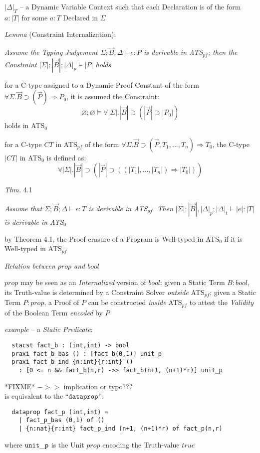 $|\Delta|_T$ -- a Dynamic Variable Context such that each Declaration
is of the form $a:|T|$ for some $a:T$ Declared in $\Sigma$

\emph{Lemma} (Constraint Internalization):

\emph{Assume the Typing Judgement $\Sigma;\vec{B};\Delta |- e:P$ is
  derivable in ATS$_{pf}$; then the Constraint
  $|\Sigma|;|\vec{B}|;|\Delta|_p \vDash |P|$ holds}

for a C-type assigned to a Dynamic Proof Constant of the form $\forall
\Sigma.\vec{B} \supset (\vec{P}) \Rightarrow P_0$, it is assumed the
Constraint:
\[
  \varnothing;\varnothing \vDash
     \forall|\Sigma|.|\vec{B}| \supset (|\vec{P}| \supset |P_0|)
\]
holds in ATS$_0$

for a C-type $CT$ in ATS$_{pf}$ of the form $\forall \Sigma.\vec{B}
\supset (\vec{P},T_1,...,T_n) \Rightarrow T_0$, the C-type $|CT|$ in
ATS$_0$ is defined as:
\[
  \forall |\Sigma|.|\vec{B}| \supset (|\vec{P}| \supset
    ((|T_1|,...,|T_n|) \Rightarrow |T_0|))
\]

\emph{Thm.} 4.1

\emph{Assume that $\Sigma;\vec{B};\Delta \vdash e:T$ is derivable in
  ATS$_{pf}$. Then $|\Sigma|;|\vec{B}|,|\Delta|_p;|\Delta|_t \vdash
  |e|:|T|$ is derivable in ATS$_0$}

by Theorem 4.1, the Proof-erasure of a Program is Well-typed in
ATS$_0$ if it is Well-typed in ATS$_{pf}$


\emph{Relation between $prop$ and $bool$}

$prop$ may be seen as an \emph{Internalized} version of $bool$: given
a Static Term $B:bool$, its Truth-value is determined by a Constraint
Solver \emph{outside} ATS$_{pf}$; given a Static Term $P:prop$, a
Proof of $P$ can be constructed \emph{inside} ATS$_{pf}$ to attest the
\emph{Validity} of the Boolean Term \emph{encoded} by $P$

\emph{example} -- a \emph{Static Predicate}:
\begin{verbatim}
  stacst fact_b : (int,int) -> bool
  praxi fact_b_bas () : [fact_b(0,1)] unit_p
  praxi fact_b_ind {n:int}{r:int} ()
    : [0 <= n && fact_b(n,r) ->> fact_b(n+1, (n+1)*r)] unit_p
\end{verbatim}
*FIXME* $->>$ implication or typo??? \\
is equivalent to the ``$\mathtt{dataprop}$'':
\begin{verbatim}
  dataprop fact_p (int,int) =
    | fact_p_bas (0,1) of ()
    | {n:nat}{r:int} fact_p_ind (n+1, (n+1)*r) of fact_p(n,r)
\end{verbatim}
where $\mathtt{unit\_p}$ is the Unit $prop$ encoding the Truth-value
$true$

